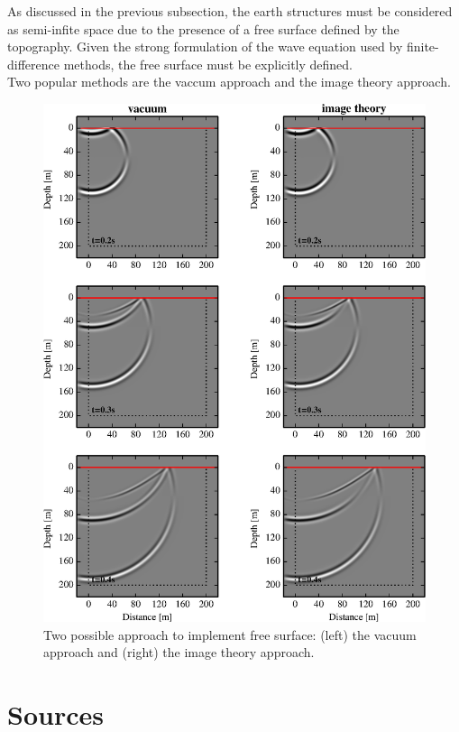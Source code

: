 \documentclass{gnulike}
\begin{document}
\noindent As discussed in the previous subsection, the earth structures must be considered as semi-infite space due to the presence of a free surface defined by the topography. Given the strong formulation of the wave equation used by finite-difference methods, the free surface must be explicitly defined.\\

\noindent Two popular methods are the vaccum approach and the image theory approach.

\begin{figure}[!ht]
  \centering
  \includegraphics[scale=1.0]{fig/validation_fsurf.eps}
  \caption{Two possible approach to implement free surface: (left) the vacuum approach and (right) the image theory approach.}
\end{figure}

\section{Sources}
\end{document}
